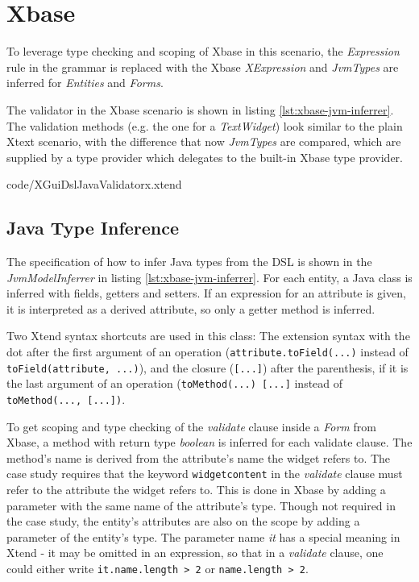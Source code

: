 \section{Xbase}
\label{sec:xbase}

To leverage type checking and scoping of Xbase in this scenario, the \emph{Expression} rule in the grammar is replaced with the Xbase \emph{XExpression} and \emph{JvmTypes} are inferred for \emph{Entities} and \emph{Forms}.

The validator in the Xbase scenario is shown in listing \ref{lst:xbase-jvm-inferrer}. The validation methods (e.g. the one for a \emph{TextWidget}) look similar to the plain Xtext scenario, with the difference that now \emph{JvmTypes} are compared, which are supplied by a type provider which delegates to the built-in Xbase type provider.

	{code/XGuiDslJavaValidatorx.xtend}

\subsection{Java Type Inference}
The specification of how to infer Java types from the DSL is shown in the \emph{JvmModelInferrer} in listing \ref{lst:xbase-jvm-inferrer}.  For each entity, a Java class is inferred with fields, getters and setters. If an expression for an attribute is given, it is interpreted as a derived attribute, so only a getter method is inferred.

Two Xtend syntax shortcuts are used in this class: The extension syntax with the dot after the first argument of an operation (\verb|attribute.toField(...)| instead of \verb|toField(attribute, ...)|), and the closure (\verb|[...]|) after the parenthesis, if it is the last argument of an operation (\lstinline[basicstyle=\ttfamily]{toMethod(...) [...]} instead of \lstinline[basicstyle=\ttfamily]{toMethod(..., [...])}.

To get scoping and type checking of the \emph{validate} clause inside a \emph{Form} from Xbase, a method with return type \emph{boolean} is inferred for each validate clause. The method's name is derived from the attribute's name the widget refers to. The case study requires that the keyword \verb|widgetcontent| in the \emph{validate} clause must refer to the attribute the widget refers to. This is done in Xbase by adding a parameter with the same name of the attribute's type. Though not required in the case study, the entity's attributes are also on the scope by adding a parameter of the entity's type. The parameter name \emph{it} has a special meaning in Xtend - it may be omitted in an expression, so that in a \emph{validate} clause, one could either write \lstinline[basicstyle=\ttfamily]{it.name.length > 2} or \verb|name.length > 2|.


